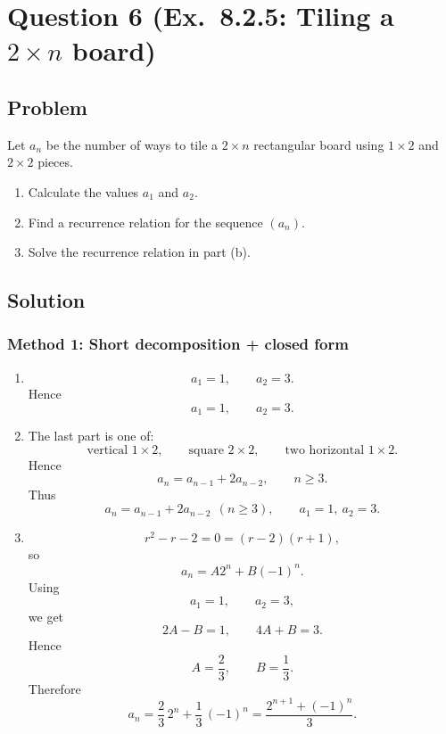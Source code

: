\documentclass[12pt]{article}
\begin{document}
\newpage

\section{Question 6 (Ex.\ 8.2.5: Tiling a \(2\times n\) board)}

\subsection{Problem}
Let \(a_n\) be the number of ways to tile a \(2\times n\) rectangular board using \(1\times 2\) and \(2\times 2\) pieces.
\begin{enumerate}[label=(\alph*)]
\item Calculate the values \(a_1\) and \(a_2\).
\item Find a recurrence relation for the sequence \((a_n)\).
\item Solve the recurrence relation in part (b).
\end{enumerate}

\subsection{Solution}

\subsubsection*{Method 1: Short decomposition + closed form}
\begin{enumerate}[label=(\alph*)]
\item
\[
a_1=1,\qquad a_2=3.
\]
Hence
\[
\boxed{a_1=1,\qquad a_2=3.}
\]

\item The last part is one of:
\[
\text{vertical }1\times 2,\qquad \text{square }2\times 2,\qquad \text{two horizontal }1\times 2.
\]
Hence
\[
a_n=a_{n-1}+2a_{n-2}, \qquad n\ge 3.
\]
Thus
\[
\boxed{a_n=a_{n-1}+2a_{n-2}\ \ (n\ge 3),\qquad a_1=1,\ a_2=3.}
\]

\item
\[
r^2-r-2=0=(r-2)(r+1),
\]
so
\[
a_n=A2^n+B(-1)^n.
\]
Using
\[
a_1=1,\qquad a_2=3,
\]
we get
\[
2A-B=1,\qquad 4A+B=3.
\]
Hence
\[
A=\frac23,\qquad B=\frac13.
\]
Therefore
\[
\boxed{a_n=\frac23\,2^n+\frac13\,(-1)^n=\frac{2^{n+1}+(-1)^n}{3}.}
\]
\end{enumerate}
\end{document}
